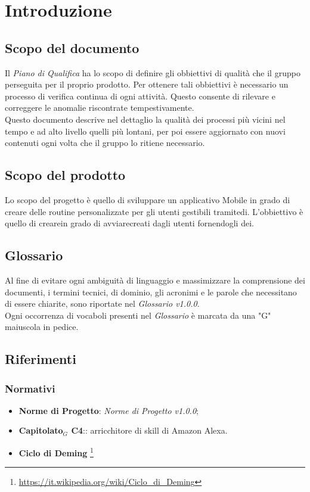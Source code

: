 \chapter{Introduzione}
\label{introduzione}
\section{Scopo del documento}
Il \textit{Piano di Qualifica} ha lo scopo di definire gli obbiettivi di qualità che il gruppo perseguita per il proprio prodotto. Per ottenere tali obbiettivi è necessario un processo di verifica continua di ogni attività. Questo consente di rilevare e correggere le anomalie riscontrate tempestivamente.\\
Questo documento descrive nel dettaglio la qualità dei processi più vicini nel tempo e ad alto livello quelli più lontani, per poi essere aggiornato con nuovi contenuti ogni volta che il gruppo lo ritiene necessario.
\section{Scopo del prodotto}
Lo scopo del progetto è quello di sviluppare un applicativo Mobile in grado di creare delle routine personalizzate per gli utenti gestibili tramitedi. L'obbiettivo è quello di crearein grado di avviarecreati dagli utenti fornendogli dei.
\section{Glossario}
Al fine di evitare ogni ambiguità di linguaggio e massimizzare la comprensione dei documenti, i termini tecnici, di dominio, gli acronimi e le parole che necessitano di essere chiarite, sono riportate nel \textit{Glossario v1.0.0}.\\
Ogni occorrenza di vocaboli presenti nel \textit{Glossario} è marcata da una "G" maiuscola in pedice.
\section{Riferimenti}
\subsection{Normativi}
\begin{itemize}
	\item  \textbf{Norme di Progetto}: \textit{Norme di Progetto v1.0.0};
	\item \textbf{Capitolato$_{G}$ C4}:: arricchitore di skill di Amazon Alexa.
	\item \textbf{Ciclo di Deming}
	\footnote{\url{https://it.wikipedia.org/wiki/Ciclo_di_Deming}}
\end{itemize}
